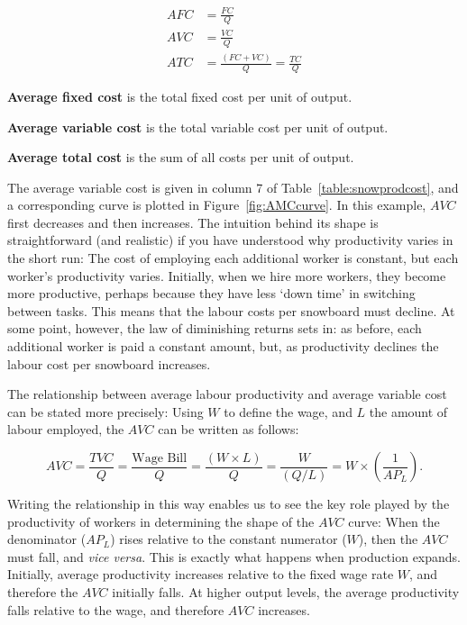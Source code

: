 \begin{align*}
AFC&=\frac{FC}{Q}	\\
AVC&=\frac{VC}{Q}	\\
ATC&=\frac{(FC+VC)}{Q}=\frac{TC}{Q}
\end{align*}

\begin{DefBox}
\textbf{Average fixed cost} is the total fixed cost per unit of output.

\textbf{Average variable cost} is the total variable cost per unit of output.

\textbf{Average total cost} is the sum of all costs per unit of output.
\end{DefBox}

The average variable cost is given in column 7 of Table~\ref{table:snowprodcost}, and a corresponding curve is plotted in Figure~\ref{fig:AMCcurve}. In this example, $AVC$ first decreases and then increases. The intuition behind its shape is straightforward (and realistic) if you have understood why productivity varies in the short run: The cost of employing each additional worker is constant, but each worker's productivity varies. Initially, when we hire more workers, they become more productive, perhaps because they have less `down time' in switching between tasks. This means that the labour costs per snowboard must decline. At some point, however, the law of diminishing returns sets in: as before, each additional worker is paid a constant amount, but, as productivity declines the labour cost per snowboard increases.



The relationship between average labour productivity and average variable cost can be stated more precisely: Using $W$ to define the wage, and $L$ the amount of labour employed, the $AVC$ can be written as follows:

\begin{equation*}
AVC=\frac{TVC}{Q}=\frac{\text{Wage Bill}}{Q}=\frac{(W\times L)}{Q}=\frac{W}{(Q/L)}=W\times\left(\frac{1}{AP_L}\right).
\end{equation*}

Writing the relationship in this way enables us to see the key role played by the productivity of workers in determining the shape of the $AVC$ curve: When the denominator ($AP_L$) rises relative to the constant numerator ($W$), then the $AVC$ must fall, and \textit{vice versa}. This is exactly what happens when production expands. Initially, average productivity increases relative to the fixed wage rate $W$, and therefore the $AVC$ initially falls. At higher output levels, the average productivity falls relative to the wage, and therefore $AVC$ increases.

